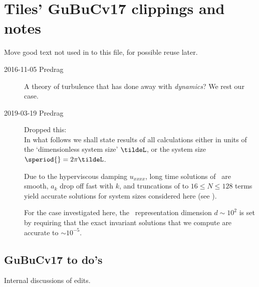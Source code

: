 
\section{Tiles' GuBuCv17 clippings and notes}
\label{sect:GuBuCv17blog}

Move good text not used in  to this file, for possible
reuse later.

\begin{description}
\item[2016-11-05 Predrag]
A theory of turbulence that has done away with \emph{dynamics}?
We rest our case.

\item[2019-03-19 Predrag] Dropped this:
\\
In what follows
we shall state results of all calculations either in units of the
`dimensionless system size' $\tildeL$, or the system size $\speriod{} = 2 \pi
\tildeL$.

Due to the hyperviscous damping $u_{xxxx}$, long time solutions of \KSe\
are smooth, $a_k$ drop off fast with $k$, and truncations of
 to $16 \leq N \leq 128$ terms yield accurate
solutions for system sizes considered here (see
).

For the case investigated here, the
\statesp\ representation dimension $d \sim 10^2$ is set by
requiring that the exact invariant solutions that we compute
are accurate to $\sim 10^{-5}$.

\end{description}

\subsection{GuBuCv17 to do's}
\label{sect:GuBuCv17ToDo}
Internal discussions of  edits.

